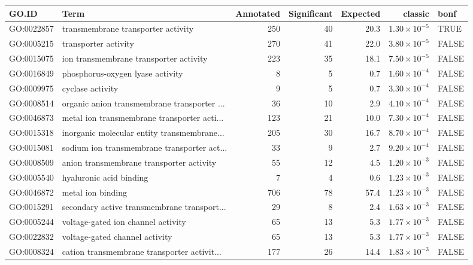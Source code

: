 \begin{table}[ht]
\centering
\begin{tabular}{llrrrrl}
  \hline
GO.ID & Term & Annotated & Significant & Expected & classic & bonf \\ 
  \hline
GO:0022857 & transmembrane transporter activity & 250 & 40 & 20.3 & $1.30 \times 10^{-5}$ & TRUE \\ 
  GO:0005215 & transporter activity & 270 & 41 & 22.0 & $3.80 \times 10^{-5}$ & FALSE \\ 
  GO:0015075 & ion transmembrane transporter activity & 223 & 35 & 18.1 & $7.50 \times 10^{-5}$ & FALSE \\ 
  GO:0016849 & phosphorus-oxygen lyase activity & 8 & 5 & 0.7 & $1.60 \times 10^{-4}$ & FALSE \\ 
  GO:0009975 & cyclase activity & 9 & 5 & 0.7 & $3.30 \times 10^{-4}$ & FALSE \\ 
  GO:0008514 & organic anion transmembrane transporter ... & 36 & 10 & 2.9 & $4.10 \times 10^{-4}$ & FALSE \\ 
  GO:0046873 & metal ion transmembrane transporter acti... & 123 & 21 & 10.0 & $7.30 \times 10^{-4}$ & FALSE \\ 
  GO:0015318 & inorganic molecular entity transmembrane... & 205 & 30 & 16.7 & $8.70 \times 10^{-4}$ & FALSE \\ 
  GO:0015081 & sodium ion transmembrane transporter act... & 33 & 9 & 2.7 & $9.20 \times 10^{-4}$ & FALSE \\ 
  GO:0008509 & anion transmembrane transporter activity & 55 & 12 & 4.5 & $1.20 \times 10^{-3}$ & FALSE \\ 
  GO:0005540 & hyaluronic acid binding & 7 & 4 & 0.6 & $1.23 \times 10^{-3}$ & FALSE \\ 
  GO:0046872 & metal ion binding & 706 & 78 & 57.4 & $1.23 \times 10^{-3}$ & FALSE \\ 
  GO:0015291 & secondary active transmembrane transport... & 29 & 8 & 2.4 & $1.63 \times 10^{-3}$ & FALSE \\ 
  GO:0005244 & voltage-gated ion channel activity & 65 & 13 & 5.3 & $1.77 \times 10^{-3}$ & FALSE \\ 
  GO:0022832 & voltage-gated channel activity & 65 & 13 & 5.3 & $1.77 \times 10^{-3}$ & FALSE \\ 
  GO:0008324 & cation transmembrane transporter activit... & 177 & 26 & 14.4 & $1.83 \times 10^{-3}$ & FALSE \\ 

\end{tabular}
\end{table}
